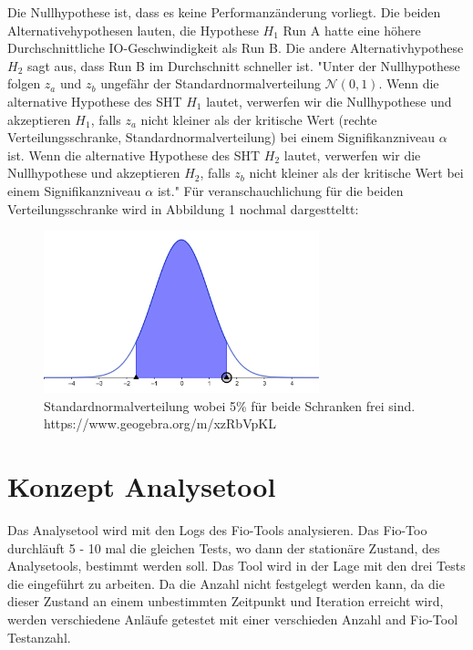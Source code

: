 Die Nullhypothese ist, dass es keine Performanzänderung vorliegt.
Die beiden Alternativehypothesen lauten, die Hypothese $H_1$ Run A hatte eine höhere Durchschnittliche IO-Geschwindigkeit als Run B.
Die andere Alternativhypothese $H_2$ sagt aus, dass Run B im Durchschnitt schneller ist.
"Unter der Nullhypothese folgen \( z_{a} \) und \( z_{b} \) ungefähr der Standardnormalverteilung \(\mathcal{N}(0, 1)\). 
Wenn die alternative Hypothese des SHT \( H_{1} \) lautet, verwerfen wir die Nullhypothese und akzeptieren \( H_{1} \), 
falls \( z_{a} \) nicht kleiner als der kritische Wert (rechte Verteilungsschranke, Standardnormalverteilung) bei einem Signifikanzniveau \(\alpha\) ist.
Wenn die alternative Hypothese des SHT \( H_{2} \) lautet, verwerfen wir die Nullhypothese und akzeptieren \( H_{2} \), 
falls \( z_{b} \) nicht kleiner als der kritische Wert bei einem Signifikanzniveau \(\alpha\) ist."
Für veranschauchlichung für die beiden Verteilungsschranke wird in Abbildung 1 nochmal dargestteltt:

\begin{figure}[h]
  \caption{Standardnormalverteilung wobei 5\% für beide Schranken frei sind. https://www.geogebra.org/m/xzRbVpKL}
  \label{fig:Standardnormalverteilung}
  \includegraphics[width=8cm]{Bilder/geogebra-export.png}
  \centering
\end{figure}


\section{Konzept Analysetool}
Das Analysetool wird mit den Logs des Fio-Tools analysieren.
Das Fio-Too durchläuft 5 - 10 mal die gleichen Tests, wo dann der stationäre Zustand, des Analysetools,
bestimmt werden soll. Das Tool wird in der Lage mit den drei Tests die eingeführt zu arbeiten.
Da die Anzahl nicht festgelegt werden kann, da die dieser Zustand an einem unbestimmten Zeitpunkt und Iteration erreicht wird,
werden verschiedene Anläufe getestet mit einer verschieden Anzahl and Fio-Tool Testanzahl.

